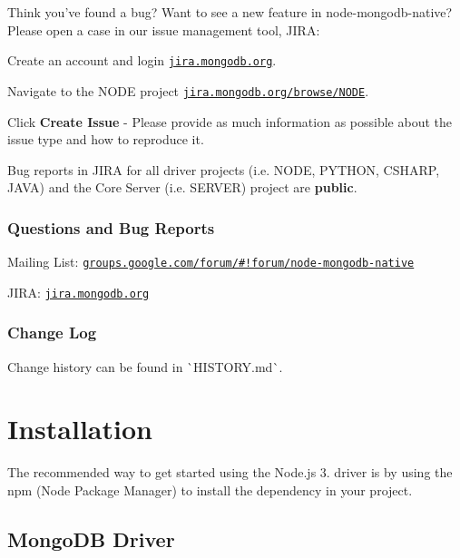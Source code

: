 Think you’ve found a bug? Want to see a new feature in {\ttfamily node-\/mongodb-\/native}? Please open a case in our issue management tool, J\+I\+RA\+:


\begin{DoxyItemize}
\item Create an account and login \href{https://jira.mongodb.org}{\tt jira.\+mongodb.\+org}.
\item Navigate to the N\+O\+DE project \href{https://jira.mongodb.org/browse/NODE}{\tt jira.\+mongodb.\+org/browse/\+N\+O\+DE}.
\item Click {\bfseries Create Issue} -\/ Please provide as much information as possible about the issue type and how to reproduce it.
\end{DoxyItemize}

Bug reports in J\+I\+RA for all driver projects (i.\+e. N\+O\+DE, P\+Y\+T\+H\+ON, C\+S\+H\+A\+RP, J\+A\+VA) and the Core Server (i.\+e. S\+E\+R\+V\+ER) project are {\bfseries public}.

\subsubsection*{Questions and Bug Reports}


\begin{DoxyItemize}
\item Mailing List\+: \href{https://groups.google.com/forum/#!forum/node-mongodb-native}{\tt groups.\+google.\+com/forum/\#!forum/node-\/mongodb-\/native}
\item J\+I\+RA\+: \href{http://jira.mongodb.org}{\tt jira.\+mongodb.\+org}
\end{DoxyItemize}

\subsubsection*{Change Log}

Change history can be found in \`{}\+H\+I\+S\+T\+O\+RY.md\`{}.

\section*{Installation}

The recommended way to get started using the Node.\+js 3. driver is by using the {\ttfamily npm} (Node Package Manager) to install the dependency in your project.

\subsection*{Mongo\+DB Driver}

